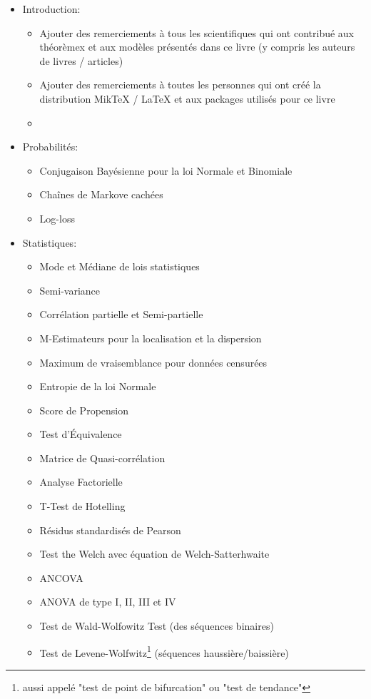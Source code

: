 	\begin{itemize}
		\item Introduction:
			\begin{itemize}
				\item Ajouter des remerciements à tous les scientifiques qui ont contribué aux théorèmex et aux modèles présentés dans ce livre (y compris les auteurs de livres / articles)
				\item Ajouter des remerciements à toutes les personnes qui ont créé la distribution MikTeX / LaTeX et aux packages utilisés pour ce livre
				\item
			\end{itemize}
		\item Probabilités:
			\begin{itemize}
				\item Conjugaison Bayésienne pour la loi Normale et Binomiale
				\item Chaînes de Markove cachées
				\item Log-loss
			\end{itemize}
		\item Statistiques: 
			\begin{itemize}
				\item Mode et Médiane de lois statistiques
				\item Semi-variance	
				\item Corrélation partielle et Semi-partielle
				\item M-Estimateurs pour la localisation et la dispersion
				\item Maximum de vraisemblance pour données censurées
				\item Entropie de la loi Normale
				\item Score de Propension
				\item Test d'Équivalence
				\item Matrice de Quasi-corrélation
				\item Analyse Factorielle
				\item T-Test de Hotelling
				\item Résidus standardisés de Pearson
				\item Test the Welch avec équation de Welch-Satterhwaite
				\item ANCOVA
				\item ANOVA de type I, II, III et IV
				\item Test de Wald-Wolfowitz Test (des séquences binaires)
				\item Test de Levene-Wolfwitz\footnote{aussi appelé  "test de point de bifurcation" ou "test de tendance"} (séquences haussière/baissière)

\end{itemize}
\end{itemize}
